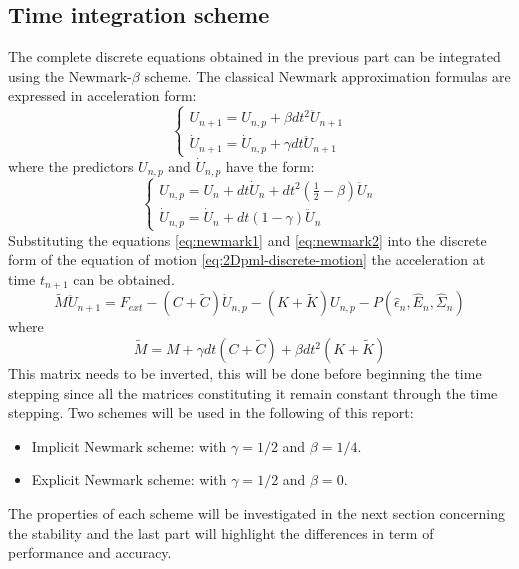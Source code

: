 \subsection{Time integration scheme}
The complete discrete equations obtained in the previous part can be integrated using the Newmark-$\beta$ scheme. The classical Newmark approximation formulas are expressed in acceleration form:
\begin{equation}
\begin{cases}
U_{n+1} = U_{n,p} + \beta dt^2 \ddot{U}_{n+1} \\
\dot{U}_{n+1} = \dot{U}_{n,p} + \gamma dt \ddot{U}_{n+1}
\end{cases}
\label{eq:newmark1}
\end{equation}
where the predictors $U_{n,p}$ and $\dot{U}_{n,p}$ have the form:
\begin{equation}
\begin{cases}
U_{n,p} = U_n + dt \dot{U}_n + dt^2 \left(\frac{1}{2} -\beta  \right)\ddot{U}_n \\
\dot{U}_{n,p} = \dot{U}_n + dt (1-\gamma)\ddot{U}_n
\end{cases}
\label{eq:newmark2}
\end{equation}
Substituting the equations \ref{eq:newmark1} and \ref{eq:newmark2} into the discrete form of the equation of motion \ref{eq:2Dpml-discrete-motion} the acceleration at time $t_{n+1}$ can be obtained.
\begin{equation}
\tilde{M}\ddot{U}_{n+1} = F_{ext} - \left(C+\tilde{C}\right)\dot{U}_{n,p} - \left(K+\tilde{K}\right)U_{n,p} - P(\hat{\epsilon}_n,\hat{E}_n,\hat{\Sigma}_n)
\end{equation}
where 
\begin{equation}
\tilde{M} = M + \gamma dt \left(C+\tilde{C}\right) + \beta dt^2 \left(K+\tilde{K}\right)
\end{equation}
This matrix needs to be inverted, this will be done before beginning the time stepping since all the matrices constituting it remain constant through the time stepping. Two schemes will be used in the following of this report:
\begin{itemize}
\item Implicit Newmark scheme: with $\gamma = 1/2$ and $\beta = 1/4$.
\item Explicit Newmark scheme: with $\gamma = 1/2$ and $\beta = 0$.
\end{itemize} 
The properties of each scheme will be investigated in the next section concerning the stability and the last part will highlight the differences in term of performance and accuracy.\\
